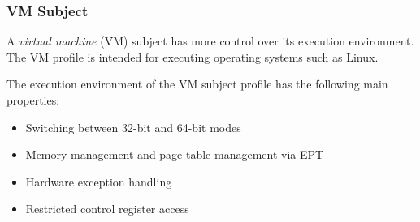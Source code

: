 \subsubsection{VM Subject}
A \emph{virtual machine} (VM) subject has more control over its execution
environment. The VM profile is intended for executing operating systems such as
Linux.

The execution environment of the VM subject profile has the following main
properties:

\begin{itemize}
	\item Switching between 32-bit and 64-bit modes
	\item Memory management and page table management via EPT
	\item Hardware exception handling
	\item Restricted control register access
\end{itemize}
